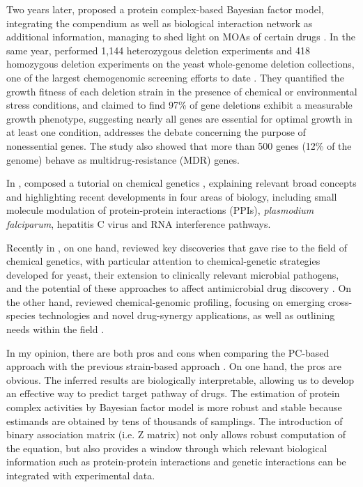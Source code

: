 \documentclass[12pt,fullpage,singlespace]{article}
\begin{document}
Two years later,  proposed a protein complex-based Bayesian factor model, integrating the compendium as well as biological interaction network as additional information, managing to shed light on MOAs of certain drugs \citep{1079}. In the same year,  performed 1,144 heterozygous deletion experiments and 418 homozygous deletion experiments on the yeast whole-genome deletion collections, one of the largest chemogenomic screening efforts to date \citep{1080}. They quantified the growth fitness of each deletion strain in the presence of chemical or environmental stress conditions, and claimed to find 97\% of gene deletions exhibit a measurable growth phenotype, suggesting nearly all genes are essential for optimal growth in at least one condition, addresses the debate concerning the purpose of nonessential genes. The study also showed that more than 500 genes (12\% of the genome) behave as multidrug-resistance (MDR) genes.

In \citeyear{1103},  composed a tutorial on chemical genetics \citep{1103}, explaining relevant broad concepts and highlighting recent developments in four areas of biology, including small molecule modulation of protein-protein interactions (PPIs), \textit{plasmodium falciparum}, hepatitis C virus and RNA interference pathways.

Recently in \citeyear{1081}, on one hand,  reviewed key discoveries that gave rise to the field of chemical genetics, with particular attention to chemical-genetic strategies developed for yeast, their extension to clinically relevant microbial pathogens, and the potential of these approaches to affect antimicrobial drug discovery \citep{1081}. On the other hand,  reviewed chemical-genomic profiling, focusing on emerging cross-species technologies and novel drug-synergy applications, as well as outlining needs within the field \citep{1082}.

In my opinion, there are both pros and cons when comparing the PC-based approach \citep{1079} with the previous strain-based approach \citep{1078}. On one hand, the pros are obvious. The inferred results are biologically interpretable, allowing us to develop an effective way to predict target pathway of drugs. The estimation of protein complex activities by Bayesian factor model is more robust and stable because estimands are obtained by tens of thousands of samplings. The introduction of binary association matrix (i.e. Z matrix) not only allows robust computation of the equation, but also provides a window through which relevant biological information such as protein-protein interactions and genetic interactions can be integrated with experimental data.
\end{document}
